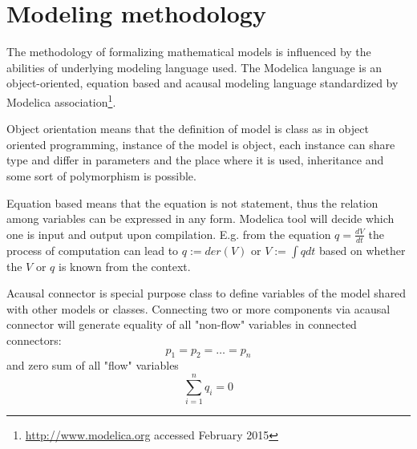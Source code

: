\section{Modeling methodology}
\label{sec:methodsmodels}
The methodology of formalizing mathematical models is influenced by the abilities of underlying modeling language used. %
The Modelica language is an object-oriented, equation based and acausal modeling language standardized by Modelica association\footnote{\url{http://www.modelica.org} accessed February 2015}.

Object orientation means that the definition of model is class as in object oriented programming, instance of the model is object,  each instance can share type and differ in parameters and the place where it is used, inheritance and some sort of polymorphism is possible.

Equation based means that the equation is not statement, thus the relation among variables can be expressed in any form. Modelica tool will decide which one is input and output upon compilation. E.g. from the equation $q = \frac{dV}{dt}$ the process of computation can lead to $ q:= der(V)$ or $ V := \int{q}dt$ based on whether the $V$ or $q$ is known from the context.

Acausal connector is special purpose class to define variables of the model shared with other models or classes. Connecting two or more components via acausal connector will generate equality of all "non-flow" variables in connected connectors: $$p_1=p_2=\ldots =p_n$$
and zero sum of all "flow" variables $$ \sum_{i=1}^n q_i=0$$

